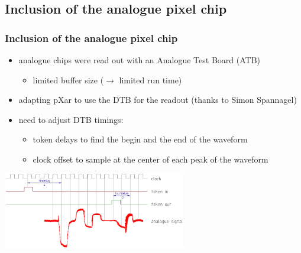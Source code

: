 \documentclass[9pt]{beamer}
\begin{document}
\subsection{Inclusion of the analogue pixel chip}
\begin{frame}
	\addtocounter{framenumber}{-1}
	\frametitle{Inclusion of the analogue pixel chip}
	\begin{itemize}
		\setlength{\itemsep}{\fill}
		\item analogue chips were read out with an Analogue Test Board (ATB)
		\begin{itemize}
			\item limited buffer size ($\rightarrow$ limited run time)
		\end{itemize}
		\item adapting pXar to use the DTB for the readout (thanks to Simon Spannagel)
		\item need to adjust DTB timings:
		\begin{itemize}
			\item token delays to find the begin and the end of the waveform
			\item clock offset to sample at the center of each peak of the waveform
		\end{itemize}
	\end{itemize}
	\begin{center}
		\includegraphics[width=8cm]{tbdelays}
	\end{center}
\end{frame}
\end{document}

